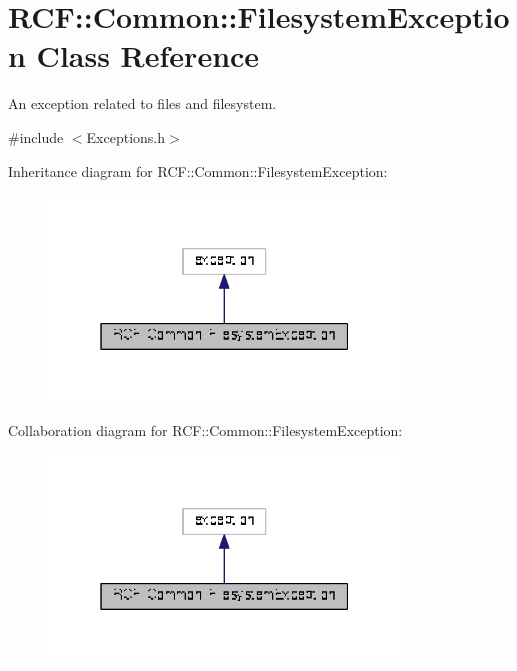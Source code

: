 \hypertarget{class_r_c_f_1_1_common_1_1_filesystem_exception}{}\section{R\+C\+F\+:\+:Common\+:\+:Filesystem\+Exception Class Reference}
\label{class_r_c_f_1_1_common_1_1_filesystem_exception}


An exception related to files and filesystem.  




{\ttfamily \#include $<$Exceptions.\+h$>$}



Inheritance diagram for R\+C\+F\+:\+:Common\+:\+:Filesystem\+Exception\+:\nopagebreak
\begin{figure}[H]
\begin{center}
\leavevmode
\includegraphics[width=265pt]{class_r_c_f_1_1_common_1_1_filesystem_exception__inherit__graph}
\end{center}
\end{figure}


Collaboration diagram for R\+C\+F\+:\+:Common\+:\+:Filesystem\+Exception\+:\nopagebreak
\begin{figure}[H]
\begin{center}
\leavevmode
\includegraphics[width=265pt]{class_r_c_f_1_1_common_1_1_filesystem_exception__coll__graph}
\end{center}
\end{figure}
